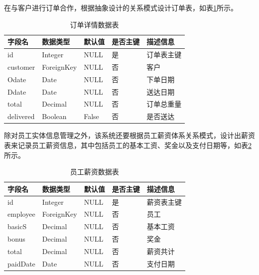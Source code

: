 在与客户进行订单合作，根据抽象设计的关系模式设计订单表，如表\ref{tab:order}所示。

\begin{table}[H]
    \centering
    \caption{订单详情数据表}
    \label{tab:order}
    \begin{tabularx}{.95\textwidth}{X<{\centering}X<{\centering}X<{\centering}X<{\centering}X<{\centering}}
        \toprule
        字段名 & 数据类型 & 默认值 & 是否主键 & 描述信息 \\
        \midrule
        id & Integer & NULL & 是 & 订单表主键 \\
        customer & ForeignKey & NULL & 否 & 客户 \\
        Odate & Date & NULL & 否 & 下单日期 \\
        Ddate & Date & NULL & 否 & 送达日期 \\
        total & Decimal & NULL & 否 & 订单总重量 \\
        delivered & Boolean & False & 否 & 是否送达 \\
        \bottomrule
    \end{tabularx}
\end{table}

除对员工实体信息管理之外，该系统还要根据员工薪资体系关系模式，设计出薪资表来记录员工薪资信息，其中包括员工的基本工资、奖金以及支付日期等，如表\ref{tab:salarytab}所示。

\begin{table}[H]
    \centering
    \caption{员工薪资数据表}
    \label{tab:salarytab}
    \begin{tabularx}{.95\textwidth}{X<{\centering}X<{\centering}X<{\centering}X<{\centering}X<{\centering}}
        \toprule
        字段名 & 数据类型 & 默认值 & 是否主键 & 描述信息 \\
        \midrule
        id & Integer & NULL & 是 & 薪资表主键 \\
        employee & ForeignKey & NULL & 否 & 员工 \\
        basicS & Decimal & NULL & 否 & 基本工资 \\
        bonus & Decimal & NULL & 否 & 奖金 \\
        total & Decimal & NULL & 否 & 薪资共计 \\
        paidDate & Date & NULL & 否 & 支付日期 \\
        \bottomrule
    \end{tabularx}
\end{table}
